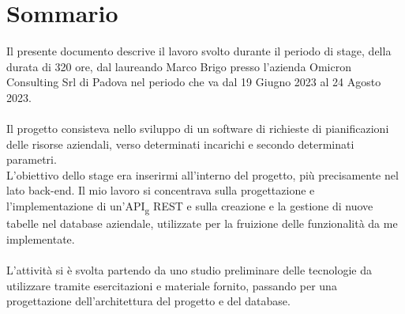 \cleardoublepage
{}
{}
\begingroup
\let\clearpage\relax
\let\cleardoublepage\relax
\let\cleardoublepage\relax

\chapter*{Sommario}

Il presente documento descrive il lavoro svolto durante il periodo di stage, della durata di 320 ore, dal laureando Marco Brigo presso l’azienda Omicron Consulting Srl di Padova nel periodo che va dal 19 Giugno 2023 al 24 Agosto 2023.\\\\
Il progetto consisteva nello sviluppo di un software di richieste di pianificazioni delle risorse aziendali, verso determinati incarichi e secondo determinati parametri.\\ L’obiettivo dello stage era inserirmi all’interno del progetto, più precisamente nel lato back-end.
Il mio lavoro si concentrava sulla progettazione e l'implementazione di un'API\textsubscript{g} REST e sulla creazione e la gestione di nuove tabelle nel database aziendale, utilizzate per la fruizione delle funzionalità da me implementate. 
\\\\L’attività si è svolta partendo da uno studio preliminare delle tecnologie da utilizzare tramite esercitazioni e materiale fornito, passando per una progettazione dell’architettura del progetto e del database.





\endgroup

\vfill
